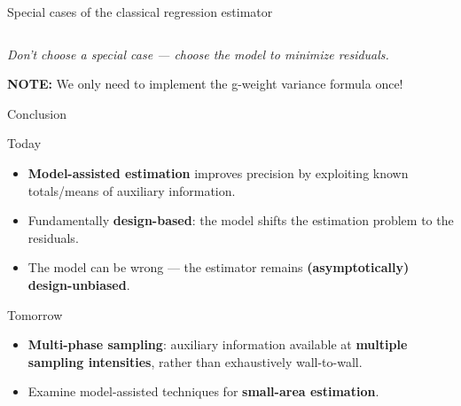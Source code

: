 \documentclass[
  ignorenonframetext,
  aspectratio=169,
]{beamer}
\begin{document}
\begin{frame}{Special cases of the classical regression estimator}
\begin{columns}[T]
\end{columns}

\vspace{.4cm}

\centering

\textit{Don't choose a special case --- choose the model to minimize residuals.}

\vfill
\footnotesize

\textbf{NOTE:} We only need to implement the g-weight variance formula
once!
\end{frame}

\begin{frame}{Conclusion}
\label{conclusion}
\begin{block}{Today}
\label{today}
\begin{itemize}
\item \textbf{Model-assisted estimation} improves precision by exploiting known totals/means of auxiliary information.
\item Fundamentally \textbf{design-based}: the model shifts the estimation problem to the residuals.
\item The model can be wrong — the estimator remains \textbf{(asymptotically) design-unbiased}.
\end{itemize}

\vspace{.5cm}
\end{block}

\begin{block}{Tomorrow}
\label{tomorrow}
\begin{itemize}
\item \textbf{Multi-phase sampling}: auxiliary information available at \textbf{multiple sampling intensities}, rather than exhaustively wall-to-wall.
\item Examine model-assisted techniques for \textbf{small-area estimation}.
\end{itemize}
\end{block}
\end{frame}
\end{document}
